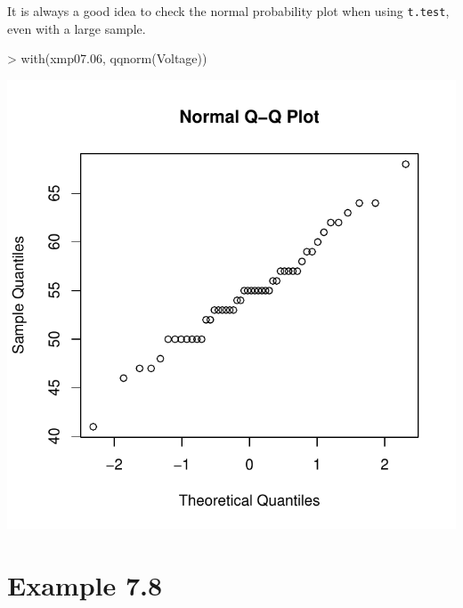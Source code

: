 \documentclass{book}
\begin{document}
It is always a good idea to check the normal probability plot when
using \texttt{t.test}, even with a large sample.
\begin{center}
\begin{Schunk}
\begin{Sinput}
> with(xmp07.06, qqnorm(Voltage))
\end{Sinput}
\end{Schunk}
\includegraphics{Devore6-xmp0706c}
\end{center}


\section{Example 7.8}
\label{sec:xmp0708}
\end{document}
